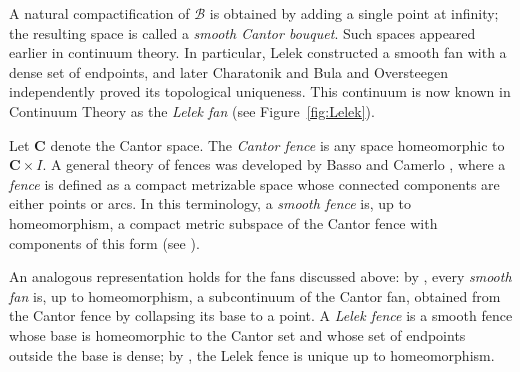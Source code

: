 \documentclass[11pt]{amsart}
\newcommand{\cantor}{\mathbf C}
\begin{document}
A natural compactification of $\mathcal{B}$ is obtained by adding a single point at infinity; the resulting space is called a \emph{smooth Cantor bouquet}. Such spaces appeared earlier in continuum theory. In particular, Lelek \cite{Lelek1961} constructed a smooth fan with a dense set of endpoints, and later Charatonik \cite{Cha89} and Bula and Oversteegen \cite{oversteegenOneLF} independently proved its topological uniqueness. This continuum is now known in Continuum Theory as the \emph{Lelek fan} (see Figure~\ref{fig:Lelek}).

Let $\cantor$ denote the Cantor space. The \emph{Cantor fence} is any space homeomorphic to $\cantor \times I$. A general theory of fences was developed by Basso and Camerlo \cite{BassoCamerlo}, where a \emph{fence} is defined as a compact metrizable space whose connected components are either points or arcs. In this terminology, a \emph{smooth fence} is, up to homeomorphism, a compact metric subspace of the Cantor fence with components of this form (see \cite[Theorem~4.2]{BassoCamerlo}). 

An analogous representation holds for the fans discussed above: by \cite[Proposition~4]{Cha89}, every \emph{smooth fan} is, up to homeomorphism, a subcontinuum of the Cantor fan, obtained from the Cantor fence by collapsing its base to a point. A \emph{Lelek fence} is a smooth fence whose base is homeomorphic to the Cantor set and whose set of endpoints outside the base is dense; by \cite{Cha89,BO90}, the Lelek fence is unique up to homeomorphism.
\end{document}
